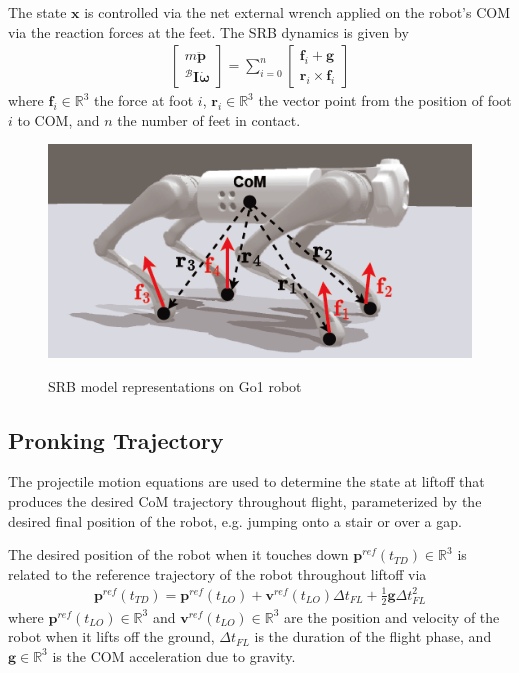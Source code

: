 \documentclass[11pt, conference]{IEEEtran}
\theoremstyle{definition} %
\newcommand{\RR}{\mathbb{R}}
\begin{document}
The state $\mathbf{x}$ is controlled via the net external wrench applied on the robot’s COM via the reaction forces
at the feet. The SRB dynamics is given by
\begin{align}
    \begin{bmatrix}
        m\ddot{\mathbf{p}}\\
        {^\mathcal{B}\mathbf{I}}\dot{\boldsymbol{\omega}}
    \end{bmatrix}
    = \sum_{i=0}^{n}
    \begin{bmatrix}
        \mathbf{f}_i + \mathbf{g}\\
        \mathbf{r}_i\times\mathbf{f}_i
    \end{bmatrix}
\end{align}
where $\mathbf{f}_i\in\RR^3$ the force at foot $i$, $\mathbf{r}_i\in\RR^3$ the vector point from the position of foot $i$ to COM, and $n$ the number of feet in contact.

\begin{figure}[htb]
    \centering
        \textsf{\includegraphics[width=0.7\columnwidth]{figures/robot_model.png}}
        \caption{SRB model representations on Go1 robot}
        \label{fig:robot_model}
\end{figure}

\subsection{Pronking Trajectory}
The projectile motion equations are used to determine the state at liftoff that produces the desired CoM trajectory throughout flight, parameterized by the desired final position of the robot, e.g. jumping onto a stair or over a gap.

The desired position of the robot when it touches down $\mathbf{p}^{ref}(t_{TD})\in\RR^3$ is related to the reference trajectory of the robot throughout liftoff via
\begin{align}
    \mathbf{p}^{ref}(t_{TD}) = \mathbf{p}^{ref}(t_{LO}) + \mathbf{v}^{ref}(t_{LO})\Delta t_{FL} + \frac{1}{2}\mathbf{g}\Delta t_{FL}^2
    \label{eqn:projectile}
\end{align}
where $\mathbf{p}^{ref}(t_{LO})\in\RR^3$ and $\mathbf{v}^{ref}(t_{LO})\in\RR^3$ are the position and velocity of the robot when it lifts off the ground, $\Delta t_{FL}$ is the duration of the flight phase, and $\mathbf{g}\in\RR^3$ is the COM acceleration due to gravity.
\end{document}
